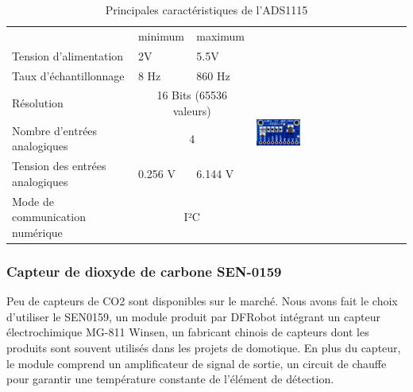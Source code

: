 \documentclass[a4paper]{report}
\begin{document}
\begin{table}[]
\centering
\begin{tabular}{|l|ll|l|}
\hline
 & \multicolumn{1}{l|}{minimum} & maximum & \multirow{7}{*}{\includegraphics[width=0.3\textwidth]{ads1115}} \\ \cline{1-3}
Tension d'alimentation          & \multicolumn{1}{l|}{2V}         & 5.5V       &  \\ \cline{1-3}
Taux d'échantillonnage          & \multicolumn{1}{l|}{8 Hz}       & 860 Hz     &  \\ \cline{1-3}
Résolution                      & \multicolumn{2}{c|}{16 Bits (65536 valeurs)} &  \\ \cline{1-3}
Nombre d'entrées analogiques    & \multicolumn{2}{c|}{4}                       &  \\ \cline{1-3}
Tension des entrées analogiques & \multicolumn{1}{l|}{0.256 V}    & 6.144 V    &  \\ \cline{1-3}
Mode de communication numérique & \multicolumn{2}{c|}{I²C}                     &  \\ \hline
\end{tabular}
\caption{Principales caractéristiques de l'ADS1115}
\label{tab:ads1115}
\end{table}

\subsubsection{Capteur de dioxyde de carbone SEN-0159}
	Peu de capteurs de CO2 sont disponibles sur le marché. Nous avons fait le choix d'utiliser le SEN0159, un module produit par DFRobot intégrant un capteur électrochimique MG-811 Winsen, un fabricant chinois de capteurs dont les produits sont souvent utilisés dans les projets de domotique. En plus du capteur, le module comprend un amplificateur de signal de sortie, un circuit de chauffe pour garantir une température constante de l'élément de détection.\\
	
\end{document}
